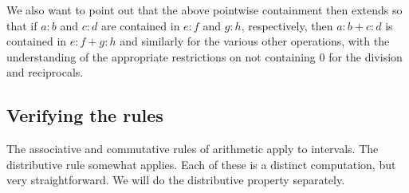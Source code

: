 \documentclass[12pt]{article}
\theoremstyle{remark}
\begin{document}
We also want to point out that the above pointwise containment then extends so that if $a:b$ and $c:d$ are contained in $e:f$ and $g:h$, respectively, then $a:b + c:d $ is contained in $e:f + g:h$ and similarly for the various other operations, with the understanding of the appropriate restrictions on not containing 0 for the division and reciprocals. 


\subsection{Verifying the rules}\label{sec:rules}

The associative and commutative rules of arithmetic apply to intervals. The distributive rule somewhat applies. Each of these is a distinct computation, but very straightforward. We will do the distributive property separately. 
\end{document}
